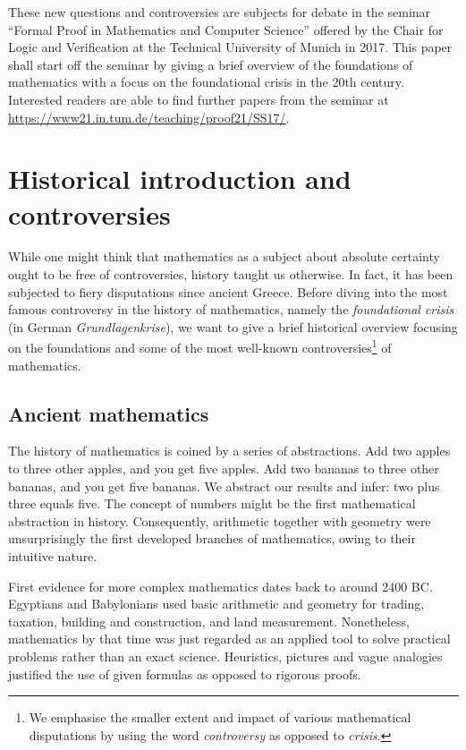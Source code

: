 \documentclass[hidelinks]{article}
\begin{document}
These new questions and controversies are subjects for debate in the seminar ``Formal Proof in Mathematics and Computer Science'' offered by the Chair for Logic and Verification at the Technical University of Munich in 2017. This paper shall start off the seminar by giving a brief overview of the foundations of mathematics with a focus on the foundational crisis in the 20th century. Interested readers are able to find further papers from the seminar at \url{https://www21.in.tum.de/teaching/proof21/SS17/}.
\newpage

\tableofcontents 
\newpage

\section{Historical introduction and controversies}
While one might think that mathematics as a subject about absolute certainty ought to be free of controversies, history taught us otherwise. In fact, it has been subjected to fiery disputations since ancient Greece. Before diving into the most famous controversy in the history of mathematics, namely the \textit{foundational crisis} (in German \textit{Grundlagenkrise}), we want to give a brief historical overview focusing on the foundations and some of the most well-known controversies\footnote{We emphasise the smaller extent and impact of various mathematical disputations by using the word \textit{controversy} as opposed to \textit{crisis}.} of mathematics.

\subsection{Ancient mathematics}

The history of mathematics is coined by a series of abstractions.
Add two apples to three other apples, and you get five apples. Add two bananas to three other bananas, and you get five bananas. We abstract our results and infer: two plus three equals five. The concept of numbers might be the first mathematical abstraction in history. Consequently, arithmetic together with geometry were unsurprisingly the first developed branches of mathematics, owing to their intuitive nature.

First evidence for more complex mathematics dates back to around 2400 BC\@. Egyptians and Babylonians used basic arithmetic and geometry for trading, taxation, building and construction, and land measurement. Nonetheless, mathematics by that time was just regarded as an applied tool to solve practical problems rather than an exact science. Heuristics, pictures and vague analogies justified the use of given formulas as opposed to rigorous proofs.
\end{document}
